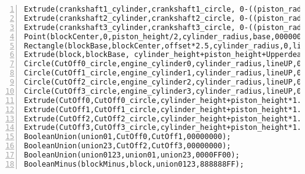 \begin{lstlisting}[numbers=left]
Extrude(crankshaft1_cylinder,crankshaft1_circle, 0-((piston_radius+circle)*2),00FFFFFF);
Extrude(crankshaft2_cylinder,crankshaft2_circle, 0-((piston_radius+circle)*2),00FFFFFF);
Extrude(crankshaft3_cylinder,crankshaft3_circle, 0-((piston_radius+circle)*2),00FFFFFF);
Point(blockCenter,0,piston_height/2,cylinder_radius,base,00000000);
Rectangle(blockBase,blockCenter,offset*2.5,cylinder_radius,0,lineUP,00000000);
Extrude(block,blockBase, cylinder_height+piston_height+Upperdeadcenterpiston_height*2,FFFFFF00);
Circle(CutOff0_circle,engine_cylinder0,cylinder_radius,lineUP,00000000);
Circle(CutOff1_circle,engine_cylinder1,cylinder_radius,lineUP,00000000);
Circle(CutOff2_circle,engine_cylinder2,cylinder_radius,lineUP,00000000);
Circle(CutOff3_circle,engine_cylinder3,cylinder_radius,lineUP,00000000);
Extrude(CutOff0,CutOff0_circle,cylinder_height+piston_height*1.5+Upperdeadcenterpiston_height,00000000);
Extrude(CutOff1,CutOff1_circle,cylinder_height+piston_height*1.5+Upperdeadcenterpiston_height,00000000);
Extrude(CutOff2,CutOff2_circle,cylinder_height+piston_height*1.5+Upperdeadcenterpiston_height,00000000);
Extrude(CutOff3,CutOff3_circle,cylinder_height+piston_height*1.5+Upperdeadcenterpiston_height,00000000);
BooleanUnion(union01,CutOff0,CutOff1,00000000);
BooleanUnion(union23,CutOff2,CutOff3,00000000);
BooleanUnion(union0123,union01,union23,0000FF00);
BooleanMinus(blockMinus,block,union0123,888888FF);
\end{lstlisting}